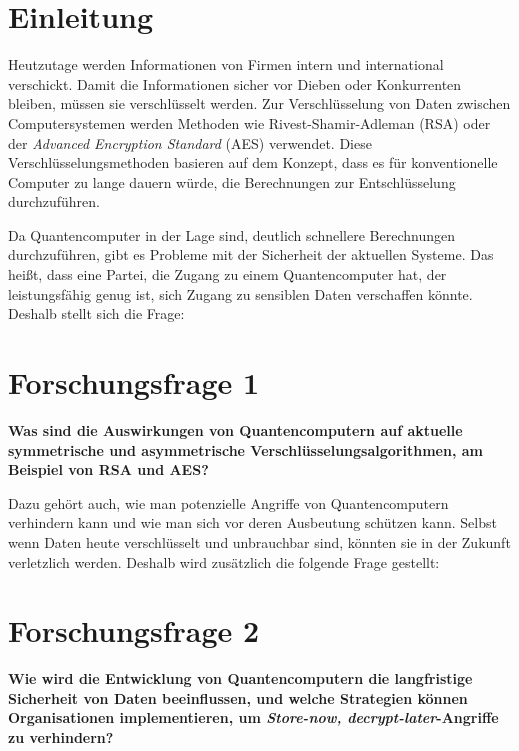 \section{Einleitung}

Heutzutage werden Informationen von Firmen intern und international verschickt. 
Damit die Informationen sicher vor Dieben oder Konkurrenten bleiben, müssen sie verschlüsselt werden. 
Zur Verschlüsselung von Daten zwischen Computersystemen werden Methoden wie Rivest-Shamir-Adleman (RSA) oder der \textit{Advanced Encryption Standard} (AES) verwendet. 
Diese Verschlüsselungsmethoden basieren auf dem Konzept, dass es für konventionelle Computer zu lange dauern würde, die Berechnungen zur Entschlüsselung durchzuführen.

Da Quantencomputer in der Lage sind, deutlich schnellere Berechnungen durchzuführen, gibt es Probleme mit der Sicherheit der aktuellen Systeme. 
Das heißt, dass eine Partei, die Zugang zu einem Quantencomputer hat, der leistungsfähig genug ist, sich Zugang zu sensiblen Daten verschaffen könnte. Deshalb stellt sich die Frage:

\section*{Forschungsfrage 1}
\textbf{Was sind die Auswirkungen von Quantencomputern auf aktuelle symmetrische und asymmetrische Verschlüsselungsalgorithmen, am Beispiel von RSA und AES?}

Dazu gehört auch, wie man potenzielle Angriffe von Quantencomputern verhindern kann und wie man sich vor deren Ausbeutung schützen kann. Selbst wenn Daten heute verschlüsselt und unbrauchbar sind, könnten sie in der Zukunft verletzlich werden. Deshalb wird zusätzlich die folgende Frage gestellt:

\section*{Forschungsfrage 2}
\textbf{Wie wird die Entwicklung von Quantencomputern die langfristige Sicherheit von Daten beeinflussen, und welche Strategien können Organisationen implementieren, um \textit{Store-now, decrypt-later}-Angriffe zu verhindern?}
